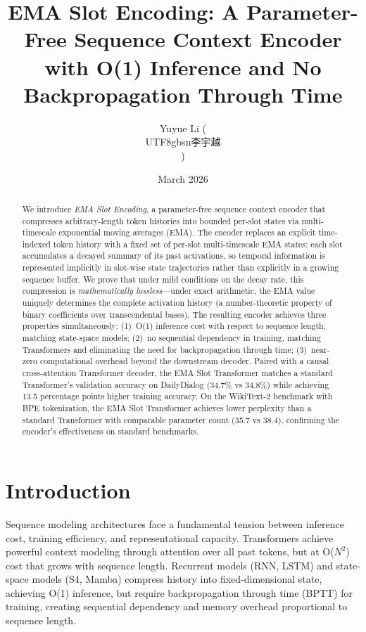 \documentclass[11pt]{article}
\title{EMA Slot Encoding: A Parameter-Free Sequence Context Encoder\\with O(1) Inference and No Backpropagation Through Time}
\author{Yuyue Li (\begin{CJK}{UTF8}{gbsn}李宇越\end{CJK})}
\date{March 2026}
\begin{document}
\maketitle

\begin{abstract}
We introduce \emph{EMA Slot Encoding}, a parameter-free sequence context encoder that compresses arbitrary-length token histories into bounded per-slot states via multi-timescale exponential moving averages (EMA). The encoder replaces an explicit time-indexed token history with a fixed set of per-slot multi-timescale EMA states: each slot accumulates a decayed summary of its past activations, so temporal information is represented implicitly in slot-wise state trajectories rather than explicitly in a growing sequence buffer. We prove that under mild conditions on the decay rate, this compression is \emph{mathematically lossless}---under exact arithmetic, the EMA value uniquely determines the complete activation history (a number-theoretic property of binary coefficients over transcendental bases). The resulting encoder achieves three properties simultaneously: (1)~O(1) inference cost with respect to sequence length, matching state-space models; (2)~no sequential dependency in training, matching Transformers and eliminating the need for backpropagation through time; (3)~near-zero computational overhead beyond the downstream decoder. Paired with a causal cross-attention Transformer decoder, the EMA Slot Transformer matches a standard Transformer's validation accuracy on DailyDialog (34.7\% vs 34.8\%) while achieving 13.5 percentage points higher training accuracy. On the WikiText-2 benchmark with BPE tokenization, the EMA Slot Transformer achieves lower perplexity than a standard Transformer with comparable parameter count (35.7 vs 38.4), confirming the encoder's effectiveness on standard benchmarks.
\end{abstract}

\section{Introduction}

Sequence modeling architectures face a fundamental tension between inference cost, training efficiency, and representational capacity. Transformers \cite{vaswani2017} achieve powerful context modeling through attention over all past tokens, but at O($N^2$) cost that grows with sequence length. Recurrent models (RNN, LSTM) and state-space models (S4, Mamba) compress history into fixed-dimensional state, achieving O(1) inference, but require backpropagation through time (BPTT) for training, creating sequential dependency and memory overhead proportional to sequence length.
\end{document}
